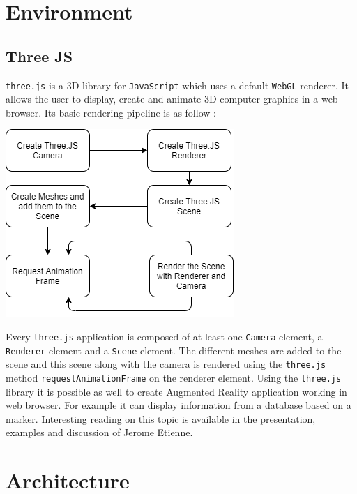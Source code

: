 \documentclass{scrreprt}
\begin{document}
\chapter{Environment}

\section{Three JS}

\texttt{three.js} is a 3D library for \texttt{JavaScript} which uses a default \texttt{WebGL} renderer. It allows the user to display, create and animate 3D computer graphics in a web browser. Its basic rendering pipeline is as follow :

\begin{center}
  \includegraphics[scale=0.5]{./basic_threejs_rendering}
\end{center}

Every \texttt{three.js} application is composed of at least one \texttt{Camera} element, a \texttt{Renderer} element and a \texttt{Scene} element. The different meshes are added to the scene and this scene along with the camera is rendered using the \texttt{three.js} method 
\texttt{requestAnimationFrame} on the renderer element. 
Using the \texttt{three.js} library it is possible as well to create Augmented Reality application working in web browser. For example it can display information from a database based on a marker. Interesting reading on this topic is available in 
the presentation, examples and discussion of \href{http://jeromeetienne.github.io/slides/augmentedrealitywiththreejs/}{Jerome Etienne}.

\chapter{Architecture \label{Architecture}}
\end{document}
